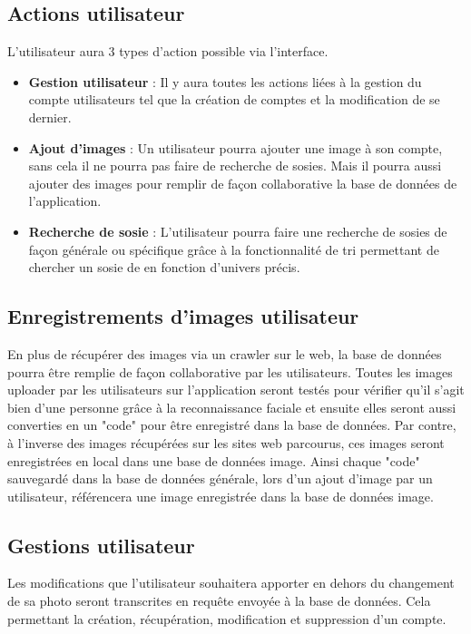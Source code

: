 \documentclass[a4paper,12pt]{article}
\begin{document}
 \subsection{Actions utilisateur}
 L'utilisateur aura 3 types d'action possible via l'interface. 
 \begin{itemize}
     \item \textbf{Gestion utilisateur} : Il y aura toutes les actions liées à la gestion du compte utilisateurs tel que la création de comptes et la modification de se dernier. 
     \item \textbf{Ajout d'images} : Un utilisateur pourra ajouter une image à son compte, sans cela il ne pourra pas faire de recherche de sosies. Mais il pourra aussi ajouter des images pour remplir de façon collaborative la base de données de l'application. 
     \item \textbf{Recherche de sosie} : L'utilisateur pourra faire une recherche de sosies de façon générale ou spécifique grâce à la fonctionnalité de tri permettant de chercher un sosie de en fonction d'univers précis. 
 \end{itemize}
 \subsection{Enregistrements d'images utilisateur}
 En plus de récupérer des images via un crawler sur le web, la base de données pourra être remplie de façon collaborative par les utilisateurs. Toutes les images uploader par les utilisateurs sur l'application seront testés pour vérifier qu'il s'agit bien d'une personne grâce à la reconnaissance faciale et ensuite elles seront aussi converties en un "code" pour être enregistré dans la base de données. Par contre, à l'inverse des images récupérées sur les sites web parcourus, ces images seront enregistrées en local dans une base de données image. Ainsi chaque "code" sauvegardé dans la base de données générale, lors d'un ajout d'image par un utilisateur, référencera une image enregistrée dans la base de données image. 
 \subsection{Gestions utilisateur}
 Les modifications que l'utilisateur souhaitera apporter en dehors du changement de sa photo seront transcrites en requête envoyée à la base de données.  Cela permettant la création, récupération, modification et suppression d'un compte. 
\end{document}
